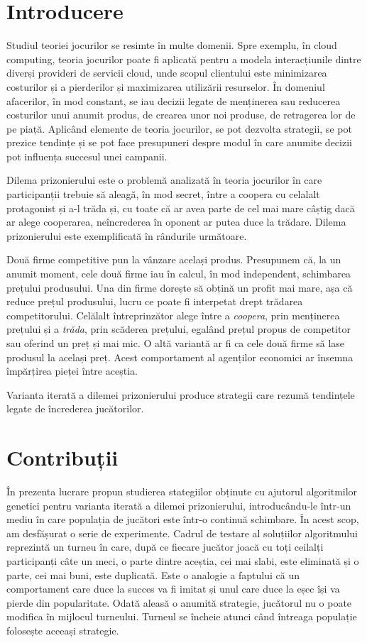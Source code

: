 \chapter*{Introducere}

Studiul teoriei jocurilor se resimte în multe domenii. Spre exemplu, în cloud computing, teoria jocurilor poate fi aplicată pentru a modela interacțiunile dintre diverși provideri de servicii cloud, unde scopul clientului este minimizarea costurilor și a pierderilor și maximizarea utilizării resurselor. În domeniul afacerilor, în mod constant, se iau decizii legate de menținerea sau reducerea costurilor unui anumit produs, de crearea unor noi produse, de retragerea lor de pe piață. Aplicând elemente de teoria jocurilor, se pot dezvolta strategii, se pot prezice tendințe și se pot face presupuneri despre modul în care anumite decizii pot influența succesul unei campanii. 

Dilema prizonierului este o problemă analizată în teoria jocurilor în care participanții trebuie să aleagă, în mod secret, între a coopera cu celalalt protagonist și a-l trăda și, cu toate că ar avea parte de cel mai mare câștig dacă ar alege cooperarea, neîncrederea în oponent ar putea duce la trădare. Dilema prizonierului este exemplificată în rândurile următoare. 
 
Două firme competitive pun la vânzare același produs. Presupunem că, la un anumit moment, cele două firme iau în calcul, în mod independent, schimbarea prețului produsului. Una din firme dorește să obțină un profit mai mare, așa că reduce prețul produsului, lucru ce poate fi interpetat drept trădarea competitorului. Celălalt întreprinzător alege între a \textit{coopera}, prin menținerea prețului și a \textit{trăda}, prin scăderea prețului, egalând prețul propus de competitor sau oferind un preț și mai mic. O altă variantă ar fi ca cele două firme să lase produsul la același preț. Acest comportament al agenților economici ar însemna împărțirea pieței între aceștia. 
  
Varianta iterată a dilemei prizonierului produce strategii care rezumă tendințele legate de încrederea jucătorilor.  

\chapter*{Contribuții}

În prezenta lucrare propun studierea stategiilor obținute cu ajutorul algoritmilor genetici pentru varianta iterată a dilemei prizonierului, introducându-le într-un mediu în care populația de jucători este într-o continuă schimbare. În acest scop, am desfășurat o serie de experimente. Cadrul de testare al soluțiilor algoritmului reprezintă un turneu în care, după ce fiecare jucător joacă cu toți ceilalți participanți câte un meci, o parte dintre aceștia, cei mai slabi, este eliminată și o parte, cei mai buni, este duplicată. Este o analogie a faptului că un comportament care duce la succes va fi imitat și unul care duce la eșec își va pierde din popularitate. Odată aleasă o anumită strategie, jucătorul nu o poate modifica în mijlocul turneului. Turneul se încheie atunci când întreaga populație folosește aceeași strategie. 
 
